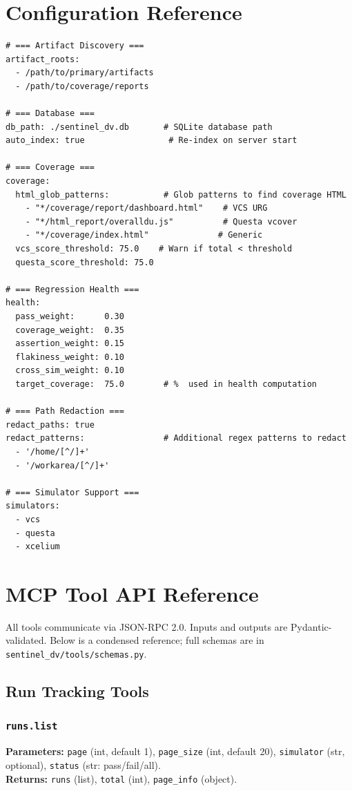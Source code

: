\documentclass[11pt,a4paper]{article}
\begin{document}
\section{Configuration Reference}

\begin{lstlisting}[style=yaml,caption={Full sentinel\_dv.yaml reference}]
# === Artifact Discovery ===
artifact_roots:
  - /path/to/primary/artifacts
  - /path/to/coverage/reports

# === Database ===
db_path: ./sentinel_dv.db       # SQLite database path
auto_index: true                 # Re-index on server start

# === Coverage ===
coverage:
  html_glob_patterns:           # Glob patterns to find coverage HTML
    - "*/coverage/report/dashboard.html"    # VCS URG
    - "*/html_report/overalldu.js"          # Questa vcover
    - "*/coverage/index.html"              # Generic
  vcs_score_threshold: 75.0    # Warn if total < threshold
  questa_score_threshold: 75.0

# === Regression Health ===
health:
  pass_weight:      0.30
  coverage_weight:  0.35
  assertion_weight: 0.15
  flakiness_weight: 0.10
  cross_sim_weight: 0.10
  target_coverage:  75.0        # %  used in health computation

# === Path Redaction ===
redact_paths: true
redact_patterns:                # Additional regex patterns to redact
  - '/home/[^/]+'
  - '/workarea/[^/]+'

# === Simulator Support ===
simulators:
  - vcs
  - questa
  - xcelium
\end{lstlisting}

\section{MCP Tool API Reference}

All tools communicate via JSON-RPC 2.0. Inputs and outputs are Pydantic-validated.
Below is a condensed reference; full schemas are in
\texttt{sentinel\_dv/tools/schemas.py}.

\subsection{Run Tracking Tools}

\subsubsection{\texttt{runs.list}}
\textbf{Parameters:} \texttt{page} (int, default 1), \texttt{page\_size} (int, default 20),
\texttt{simulator} (str, optional), \texttt{status} (str: pass/fail/all).\\
\textbf{Returns:} \texttt{runs} (list), \texttt{total} (int), \texttt{page\_info} (object).
\end{document}

